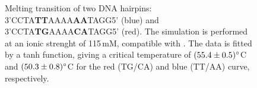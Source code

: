 \begin{figure}[htb]
       \begin{center}
               \scalebox{0.9}{
                        \nonstopmode
                        
                        \errorstopmode
                        \rule[-0.5cm]{0cm}{0cm}}
                \caption{Melting transition of two DNA hairpins: 3'CCTA\textbf{TT}AAAA\textbf{AA}TAGG5' (blue) and 3'CCTA\textbf{TG}AAAA\textbf{CA}TAGG5' (red). The simulation is performed at an ionic strenght of 115\,mM, compatible with \cite{vallone1999melting}. The data is fitted by a tanh function, giving a critical temperature of $(55.4 \pm 0.5)^{\circ}$C and $(50.3 \pm 0.8)^{\circ}$C for the red (TG/CA) and blue (TT/AA) curve, respectively.}
                \label{meltingTemperature}
        \end{center}
\end{figure}

